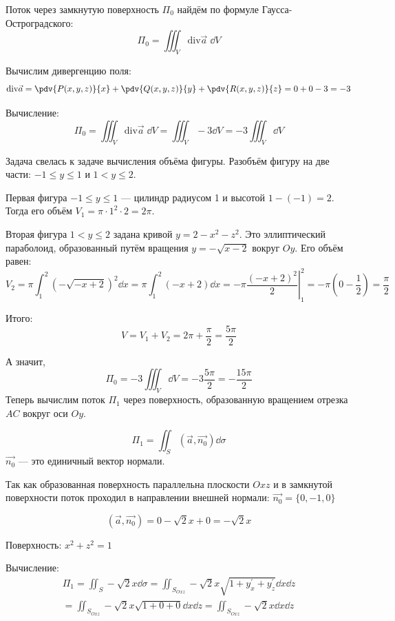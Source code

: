Поток через замкнутую поверхность \(\Pi_0\)
найдём по формуле Гаусса-Остроградского:
\[ \Pi_{0} = \iiint_{V} \mathrm{div} \vec{a} \; \dd V \]

Вычислим дивергенцию поля:
\[
  \mathrm{div} \vec{a}
  = \pdv{P(x, y, z)}{x} + \pdv{Q(x, y, z)}{y} + \pdv{R(x, y, z)}{z}
  = 0 + 0 - 3 = -3
\]

Вычисление:
\[
  \Pi_0
  = \iiint_{V} \mathrm{div} \vec{a} \; \dd V
  = \iiint_{V} -3 \dd V
  = -3 \iiint_{V} \dd V
\]

Задача свелась к задаче вычисления объёма фигуры.
Разобъём фигуру на две части: \(-1 \leq y \leq 1\) и \(1 < y \leq 2\).

Первая фигура \(-1 \leq y \leq 1\) --- цилиндр радиусом 1
и высотой \(1 - (-1) = 2\).
Тогда его объём \(V_1 = \pi \cdot 1^2 \cdot 2 = 2 \pi\).

Вторая фигура \(1 < y \leq 2\) задана кривой
\(y = 2 - x^2 - z^2\).
Это эллиптический параболоид, образованный путём вращения
\(y = -\sqrt{x - 2}\) вокруг \(Oy\).
Его объём равен:
\[
  V_2 = \pi \int_{1}^{2} {\left(-\sqrt{-x + 2}\right)}^2 \dd x
  = \pi \int_{1}^{2} (-x + 2) \dd x
  = -\pi \left. \frac{{(-x + 2)}^2}{2}\right\rvert_{1}^{2}
  = -\pi \left(0 - \frac{1}{2}\right)
  = \frac{\pi}{2}
\]

Итого:
\[V = V_1 + V_2 = 2 \pi + \frac{\pi}{2} = \frac{5 \pi}{2}\]

А значит,
\[\Pi_0 = -3 \iiint_{V} \dd V = -3 \frac{5 \pi}{2} = -\frac{15 \pi}{2}\]
Теперь вычислим поток \(\Pi_{1}\) через поверхность,
образованную вращением отрезка \(AC\) вокруг оси \(Oy\).

\[
    \Pi_{1} = \iint_{S} (\vec{a}, \vec{n_{0}}) \dd \sigma
\]
\(\vec{n_0}\) --- это единичный вектор нормали.

Так как образованная поверхность параллельна плоскости \(Oxz\)
и в замкнутой поверхности поток проходил в направлении внешней нормали:
\(\Vec{n_{0}} = \{0,-1,0\}\)

\[(\vec{a}, \vec{n_{0}}) = 0 - \sqrt{2}x + 0 = -\sqrt{2}x\]

Поверхность: \(x^2 + z^2 = 1\)

Вычисление:
\[
\begin{split}
  \Pi_{1} = \iint_{S} -\sqrt{2}x \dd \sigma
    = \iint_{S_{Oxz}} -\sqrt{2}x
      \sqrt{1 + y_{x}^\prime + y_{z}^\prime} \dd x \dd z \\
    = \iint_{S_{Oxz}} -\sqrt{2}x \sqrt{1 + 0 + 0} \dd x \dd z
    = \iint_{S_{Oxz}} -\sqrt{2}x \dd x \dd z
\end{split}
\]


